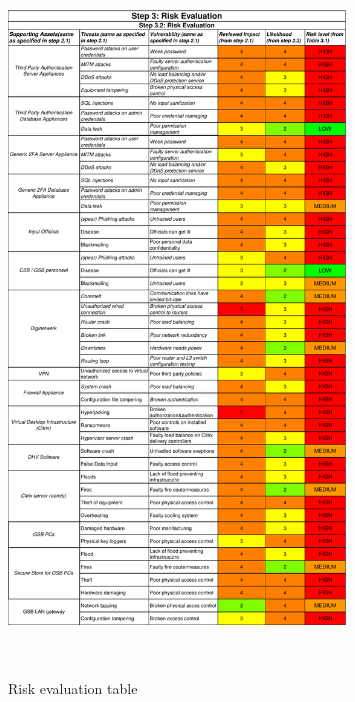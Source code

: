 \begin{figure}
    \centering
    \includegraphics[keepaspectratio,width=0.8\textwidth]{03-risk-analysis/004-RE/img/riskEval.pdf}
    \caption{Risk evaluation table}~\label{fig:riskEval}
\end{figure}

